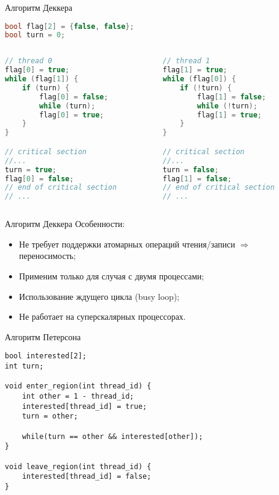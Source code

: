 \begin{frame}[fragile]{Алгоритм Деккера}
\begin{lstlisting}[language=C++,basicstyle=\ttfamily,keywordstyle=\color{blue},basicstyle=\scriptsize]
bool flag[2] = {false, false};
bool turn = 0;
\end{lstlisting}

\begin{columns}[t]
    \begin{column}[T]{0.45\textwidth}
        \begin{lstlisting}[language=C++,basicstyle=\ttfamily,keywordstyle=\color{blue},basicstyle=\scriptsize]
// thread 0
flag[0] = true;
while (flag[1]) {
    if (turn) {
        flag[0] = false;
        while (turn);
        flag[0] = true;
    }
}

// critical section
//...
turn = true;
flag[0] = false;
// end of critical section
// ...
        \end{lstlisting}
    \end{column}
    \begin{column}[T]{0.45\textwidth}
        \begin{lstlisting}[language=C++,basicstyle=\ttfamily,keywordstyle=\color{blue},basicstyle=\scriptsize]
// thread 1
flag[1] = true;
while (flag[0]) {
    if (!turn) {
        flag[1] = false;
        while (!turn);
        flag[1] = true;
    }
}

// critical section
//...
turn = false;
flag[1] = false;
// end of critical section
// ...
        \end{lstlisting}
    \end{column}
\end{columns}
\end{frame}

\begin{frame}{Алгоритм Деккера}
Особенности:
\begin{itemize}
    \item Не требует поддержки атомарных операций чтения/записи $\Rightarrow$
    переносимость;
    \item Применим только для случая с двумя процессами;
    \item Использование ждущего цикла (\abbr busy loop);
    \item Не работает на суперскалярных процессорах.
\end{itemize}
\end{frame}

\begin{frame}[fragile]{Алгоритм Петерсона}
\begin{lstlisting}[basicstyle=\small]
bool interested[2];
int turn;

void enter_region(int thread_id) {
    int other = 1 - thread_id;
    interested[thread_id] = true;
    turn = other;

    while(turn == other && interested[other]);
}

void leave_region(int thread_id) {
    interested[thread_id] = false;
}
\end{lstlisting}
\end{frame}

